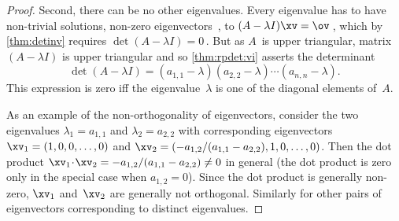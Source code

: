 \begin{proof}
Second, there can be no other eigenvalues.
Every eigenvalue has to have non-trivial solutions, non-zero eigenvectors~\xv, to \((A-\lambda I)\xv=\ov\)\,, which by \autoref{thm:detinv} requires \(\det(A-\lambda I)=0\)\,.
But as \(A\)~is upper triangular, matrix \((A-\lambda I)\) is upper triangular and so \autoref{thm:rpdet:vi} asserts the determinant
\begin{equation*}
\det(A-\lambda I)=(a_{1,1}-\lambda)(a_{2,2}-\lambda)
\cdots(a_{n,n}-\lambda).
\end{equation*}
This expression is zero iff the eigenvalue~\(\lambda\) is one of the diagonal elements of~\(A\).

As an example of the non-orthogonality of eigenvectors, consider the two eigenvalues \(\lambda_1=a_{1,1}\) and \(\lambda_2=a_{2,2}\) with  corresponding eigenvectors \(\xv_1=(1,0,0,\ldots,0)\) and \(\xv_2=(-a_{1,2}/(a_{1,1}-a_{2,2}),1,0,\ldots,0)\).
Then the dot product \(\xv_1\cdot\xv_2=-a_{1,2}/(a_{1,1}-a_{2,2})\neq 0\) in general (the dot product is zero only in the special case when \(a_{1,2}=0\)).
Since the dot product is generally non-zero, \(\xv_1\) and~\(\xv_2\) are generally not orthogonal.
Similarly for other pairs of eigenvectors corresponding to distinct eigenvalues.
\end{proof}



